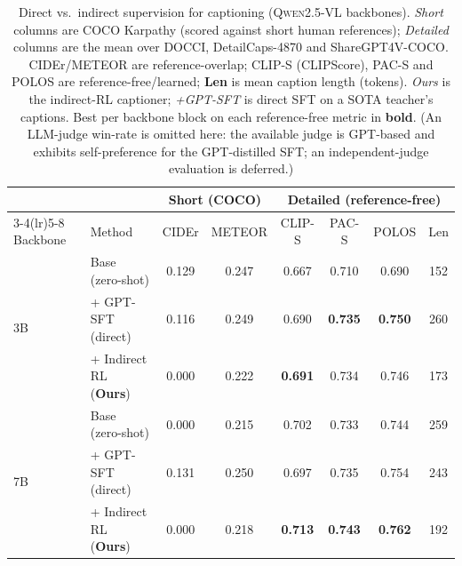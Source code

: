 \begin{table}[t]
\caption{Direct vs.\ indirect supervision for captioning (\textsc{Qwen2.5-VL} backbones). \emph{Short}
columns are COCO Karpathy (scored against short human references); \emph{Detailed} columns are the mean over
DOCCI, DetailCaps-4870 and ShareGPT4V-COCO. CIDEr/METEOR are reference-overlap; CLIP-S (CLIPScore), PAC-S and
POLOS are reference-free/learned; \textbf{Len} is mean caption length (tokens). \emph{Ours} is the indirect-RL
captioner; \emph{+GPT-SFT} is direct SFT on a SOTA teacher's captions. Best per backbone block on each
reference-free metric in \textbf{bold}. (An LLM-judge win-rate is omitted here: the available judge is GPT-based and
exhibits self-preference for the GPT-distilled SFT; an independent-judge evaluation is deferred.)}
\label{tab:cap_main}
\begin{center}
\small
\begin{tabular}{llcccccc}
\toprule
 & & \multicolumn{2}{c}{Short (COCO)} & \multicolumn{4}{c}{Detailed (reference-free)} \\
\cmidrule(lr){3-4}\cmidrule(lr){5-8}
Backbone & Method & CIDEr & METEOR & CLIP-S & PAC-S & POLOS & Len \\
\midrule
\multirow{3}{*}{3B}
 & Base (zero-shot)              & 0.129 & 0.247 & 0.667 & 0.710 & 0.690 & 152 \\
 & \; + GPT-SFT (direct)         & 0.116 & 0.249 & 0.690 & \textbf{0.735} & \textbf{0.750} & 260 \\
 & \; + Indirect RL (\textbf{Ours}) & 0.000 & 0.222 & \textbf{0.691} & 0.734 & 0.746 & 173 \\
\midrule
\multirow{3}{*}{7B}
 & Base (zero-shot)              & 0.000 & 0.215 & 0.702 & 0.733 & 0.744 & 259 \\
 & \; + GPT-SFT (direct)         & 0.131 & 0.250 & 0.697 & 0.735 & 0.754 & 243 \\
 & \; + Indirect RL (\textbf{Ours}) & 0.000 & 0.218 & \textbf{0.713} & \textbf{0.743} & \textbf{0.762} & 192 \\
\bottomrule
\end{tabular}
\end{center}
\end{table}
